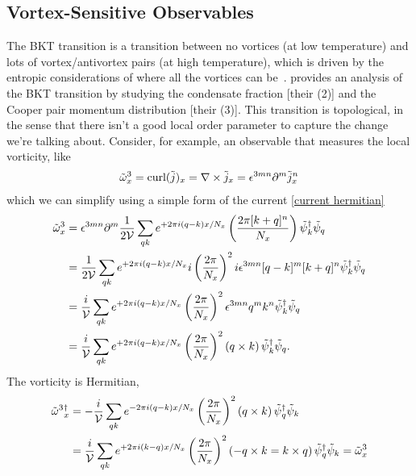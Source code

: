 \subsection{Vortex-Sensitive Observables}\label{sec:vortex}

The BKT transition is a transition between no vortices (at low temperature) and lots of vortex/antivortex pairs (at high temperature), which is driven by the entropic considerations of where all the vortices can be~\cite{1971JETP...32..493B,1972JETP...34..610B,Kosterlitz:1973}.
 provides an analysis of the BKT transition by studying the condensate fraction [their (2)] and the Cooper pair momentum distribution [their (3)].
This transition is topological, in the sense that there isn't a good local order parameter to capture the change we're talking about.
Consider, for example, an observable that measures the local vorticity, like
\begin{align}
	\tilde{\omega}^3_x = \text{curl}(\tilde{j})_x = \nabla \times \tilde{j}_x = \epsilon^{3mn} \partial^m \tilde{j}^n_x
\end{align}
which we can simplify using a simple form of the current \eqref{current hermitian}
\begin{align}
	\tilde{\omega}^3_x
	&=
	\epsilon^{3mn} \partial^m \frac{1}{2\mathcal{V}}
	\sum_{qk} e^{+2\pi i (q-k) x / N_x} \left(\frac{2\pi [ k+q ]^n}{N_x}\right)
	\tilde{\psi}{}^{\dagger}_{k} \tilde{\psi}_{q}
	\nonumber\\
	&=
	\frac{1}{2\mathcal{V}}
	\sum_{qk} e^{+2\pi i (q-k) x / N_x} i \left(\frac{2\pi}{N_x}\right)^2 i \epsilon^{3mn} [q-k]^m[ k+q ]^n
	\tilde{\psi}{}^{\dagger}_{k} \tilde{\psi}_{q}
	\nonumber\\
	&=
	\frac{i}{\mathcal{V}}
	\sum_{qk} e^{+2\pi i (q-k) x / N_x} \left(\frac{2\pi}{N_x}\right)^2 \epsilon^{3mn} q^m k^n
	\tilde{\psi}{}^{\dagger}_{k} \tilde{\psi}_{q}
	\nonumber\\
	&=
	\frac{i}{\mathcal{V}}
	\sum_{qk} e^{+2\pi i (q-k) x / N_x} \left(\frac{2\pi}{N_x}\right)^2 (q \times k)\,
	\tilde{\psi}{}^{\dagger}_{k} \tilde{\psi}_{q}.
	\label{eq:vorticity}
\end{align}
The vorticity is Hermitian,
\begin{align}
	\tilde{\omega}^3{}^{\dagger}_x
	&=
	-\frac{i}{\mathcal{V}}
	\sum_{qk} e^{-2\pi i (q-k) x / N_x} \left(\frac{2\pi}{N_x}\right)^2 (q \times k)\,
	\tilde{\psi}{}^{\dagger}_{q} \tilde{\psi}_{k}
	\nonumber\\
	&=
	\frac{i}{\mathcal{V}}
	\sum_{qk} e^{+2\pi i (k-q) x / N_x} \left(\frac{2\pi}{N_x}\right)^2 (-q \times k = k \times q)\,
	\tilde{\psi}{}^{\dagger}_{q} \tilde{\psi}_{k}
	=
	\tilde{\omega}^3_x
\end{align}
